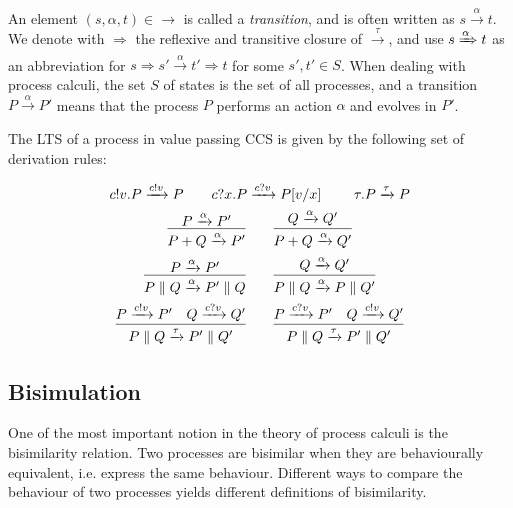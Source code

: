 An element $(s, \alpha, t) \in \rightarrow$ is called a \textit{transition}, and is often written as $s \xrightarrow{\alpha} t$. We denote with $\Rightarrow$ the reflexive and transitive closure of $\xrightarrow{\tau}$, and use $s \xRightarrow{\alpha} t$ as an abbreviation for $s \Rightarrow s' \xrightarrow{\alpha} t' \Rightarrow t$ for some $s', t' \in S$. When dealing with process calculi, the set $S$ of states is the set of all processes, and a transition $P \xrightarrow{\alpha} P'$ means that the process $P$ performs an action $\alpha$ and evolves in $P'$.

The LTS of a process in value passing CCS is given by the following set of derivation rules: 

\begin{gather*}
c!v.P \xrightarrow{c!v} P \qquad c?x.P \xrightarrow{c?v} P[v/x] \qquad \	\tau.P \xrightarrow{\tau} P
\\
\infer{P + Q \xrightarrow{\alpha} P'}{P \xrightarrow{\alpha} P'} \qquad \infer{P + Q \xrightarrow{\alpha} Q'}{Q \xrightarrow{\alpha} Q'} 
\\
\infer{P \parallel Q \xrightarrow{\alpha} P'\parallel Q}{P \xrightarrow{\alpha} P'} \qquad \infer{P \parallel Q \xrightarrow{\alpha} P\parallel Q'}{Q \xrightarrow{\alpha} Q'} 
\\
\infer{P \parallel Q \xrightarrow{\tau} P'\parallel Q'}{P \xrightarrow{c!v} P' & Q \xrightarrow{c?v} Q' } \qquad
\infer{P \parallel Q \xrightarrow{\tau} P'\parallel Q'}{P \xrightarrow{c?v} P' & Q \xrightarrow{c!v} Q' } 
\\
\end{gather*}

\subsection{Bisimulation}

One of the most important notion in the theory of process calculi is the bisimilarity relation. Two processes are bisimilar when they are behaviourally equivalent, i.e. express the same behaviour. Different ways to compare the behaviour of two processes yields different definitions of bisimilarity.

